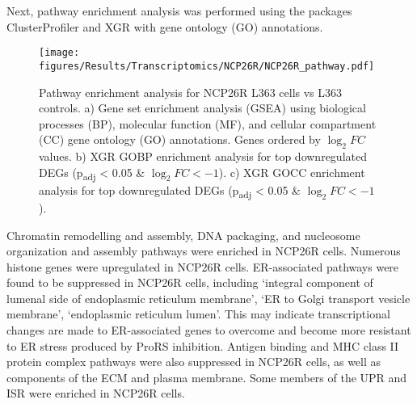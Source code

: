Next, pathway enrichment analysis was performed using the packages ClusterProfiler and XGR with gene ontology (GO) annotations.
\begin{figure}[htb]
\centering
\texttt{[image: figures/Results/Transcriptomics/NCP26R/NCP26R\_pathway.pdf]}
\caption[Pathway enrichment analysis- NCP26R cells]{Pathway enrichment analysis for NCP26R L363 cells vs L363 controls.
a) Gene set enrichment analysis (GSEA) using biological processes (BP), molecular function (MF), and cellular compartment (CC) gene ontology (GO) annotations. Genes ordered by $\log_{2}FC$ values.
b) XGR GOBP enrichment analysis for top downregulated DEGs (p\textsubscript{adj} < 0.05 \& $\log_{2}FC < -1$).
c) XGR GOCC enrichment analysis for top downregulated DEGs (p\textsubscript{adj} < 0.05 \& $\log_{2}FC < -1$).
}
\label{fig:NCP26R_pathway}
\end{figure}
Chromatin remodelling and assembly, DNA packaging, and nucleosome organization and assembly pathways were enriched in NCP26R cells.
Numerous histone genes were upregulated in NCP26R cells.
ER-associated pathways were found to be suppressed in NCP26R cells, including `integral component of lumenal side of endoplasmic reticulum membrane', `ER to Golgi transport vesicle membrane', `endoplasmic reticulum lumen'.
This may indicate transcriptional changes are made to ER-associated genes to overcome and become more resistant to ER stress produced by ProRS inhibition.
Antigen binding and MHC class II protein complex pathways were also suppressed in NCP26R cells, as well as components of the ECM and plasma membrane.
Some members of the UPR and ISR were enriched in NCP26R cells.

